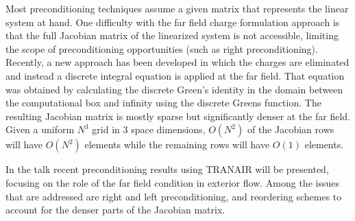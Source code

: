 \documentclass{report}
\begin{document}
Most preconditioning techniques assume a given matrix that
represents the linear system at hand.
One difficulty with the far field charge formulation approach is that the
full Jacobian matrix of the
linearized system is not accessible, limiting the scope of
preconditioning opportunities (such as right preconditioning).
Recently, a new approach has been developed in which the charges
are eliminated and instead a discrete integral equation is
applied at the far field.
That equation was obtained by calculating the discrete
Green's identity in the domain between
the computational box and infinity using the discrete Greens function.
The resulting Jacobian
matrix is mostly sparse but significantly denser at the far field.
Given a uniform $N^3$ grid in
$3$ space dimensions, $O(N^2)$ of the Jacobian rows will have
$O(N^2)$ elements while the remaining rows
will have $O(1)$ elements.


In the talk recent preconditioning results using TRANAIR will be presented,
focusing on the role of the far field condition in exterior flow.
Among the issues that are addressed are right and left preconditioning,
and reordering schemes to account for the
denser parts of the Jacobian matrix.
\end{document}

